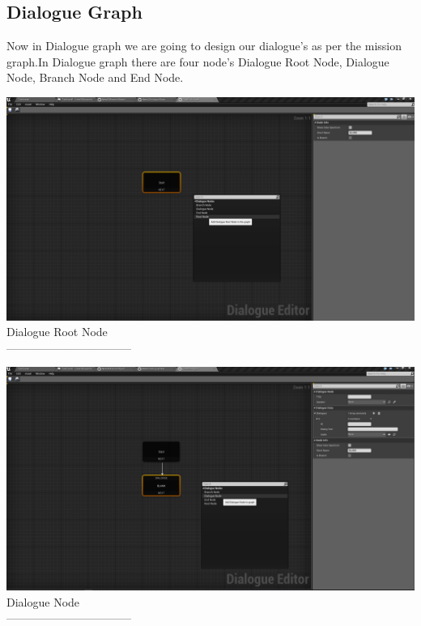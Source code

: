 \documentclass[12pt]{article}
\begin{document}
	  \subsection{Dialogue Graph}
	  Now in Dialogue graph we are going to design our dialogue's as per the mission graph.In Dialogue graph there are four node's
	  Dialogue Root Node, Dialogue Node, Branch Node and End Node.
	  \begin{center}
	  \includegraphics[scale=0.2]{DiaogueRootNode.png}\\
	  Dialogue Root Node\\
	  ---------------------------------
	  \end{center}
	    \begin{center}
	  \includegraphics[scale=0.2]{DialogueNode.png}\\
	  Dialogue Node\\
	  ---------------------------------
	  \end{center}
\end{document}
